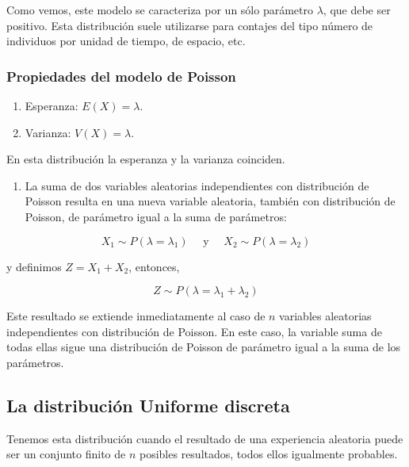 \documentclass[
  a4paper,
  DIV=11,
  numbers=noendperiod]{scrreprt}
\providecommand{\tightlist}{%
  \setlength{\itemsep}{0pt}\setlength{\parskip}{0pt}}\usepackage{longtable,booktabs,array}
\begin{document}
Como vemos, este modelo se caracteriza por un sólo parámetro
\(\lambda\), que debe ser positivo. Esta distribución suele utilizarse
para contajes del tipo número de individuos por unidad de tiempo, de
espacio, etc.

\subsubsection{Propiedades del modelo de
Poisson}\label{propiedades-del-modelo-de-poisson}

\begin{enumerate}
\def\labelenumi{\arabic{enumi}.}
\tightlist
\item
  Esperanza: \(E(X)=\lambda\).
\item
  Varianza: \(V(X)=\lambda\).
\end{enumerate}

En esta distribución la esperanza y la varianza coinciden.

\begin{enumerate}
\def\labelenumi{\arabic{enumi}.}
\setcounter{enumi}{2}
\tightlist
\item
  La suma de dos variables aleatorias independientes con distribución de
  Poisson resulta en una nueva variable aleatoria, también con
  distribución de Poisson, de parámetro igual a la suma de parámetros:
\end{enumerate}

\[
X_{1} \sim P\left(\lambda=\lambda_{1}\right) \quad \text { y } \quad X_{2} \sim P\left(\lambda=\lambda_{2}\right)
\]

y definimos \(Z=X_{1}+X_{2}\), entonces,

\[
Z \sim P\left(\lambda=\lambda_{1}+\lambda_{2}\right)
\]

Este resultado se extiende inmediatamente al caso de \(n\) variables
aleatorias independientes con distribución de Poisson. En este caso, la
variable suma de todas ellas sigue una distribución de Poisson de
parámetro igual a la suma de los parámetros.

\subsection{La distribución Uniforme
discreta}\label{la-distribuciuxf3n-uniforme-discreta}

Tenemos esta distribución cuando el resultado de una experiencia
aleatoria puede ser un conjunto finito de \(n\) posibles resultados,
todos ellos igualmente probables.
\end{document}
